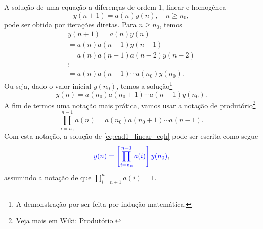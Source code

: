 A solução de uma equação a diferenças de ordem 1, linear e homogênea
\begin{equation}\label{eq:ead1_linear_eqh}
  y(n+1) = a(n)y(n),\quad n\geq n_0,
\end{equation}
pode ser obtida por iterações diretas. Para $n\geq n_0$, temos
\begin{gather}
  y(n+1) = a(n)y(n) \\
  = a(n)a(n-1)y(n-1)\\
  = a(n)a(n-1)a(n-2)y(n-2) \\
  \vdots\\
  = a(n)a(n-1)\cdots a(n_0)y(n_0).
\end{gather}
Ou seja, dado o valor inicial $y(n_0)$, temos a solução\footnote{A demonstração por ser feita por indução matemática.}
\begin{equation}
  y(n) = a(n_0)a(n_0+1)\cdots a(n-1)y(n_0).
\end{equation}
A fim de termos uma notação mais prática, vamos usar a notação de produtório\footnote {Veja mais em \href{https://pt.wikipedia.org/wiki/Produt\%C3\%B3rio}{Wiki: Produtório}.}
\begin{equation}
  \prod_{i=n_0}^{n-1} a(n) = a(n_0)a(n_0+1)\cdots a(n-1).
\end{equation}
Com esta notação, a solução de \eqref {eq:ead1_linear_eqh} pode ser escrita como segue
\begin{equation}\label{eq:ead1_linear_eqh_sol}
  {\color{blue} y(n) = \left[\prod_{i=n_0}^{n-1}a(i)\right]y(n_0)},
\end{equation}
assumindo a notação de que $\prod_{i=n+1}^na(i)=1$.


